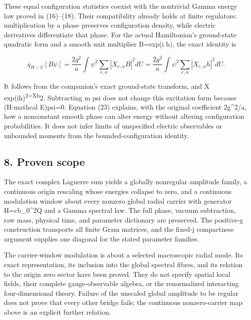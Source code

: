 \documentclass[
  11pt,
]{article}
\begin{document}
These equal configuration statistics coexist with the nontrivial Gamma
energy law proved in (16)--(18). Their compatibility already holds at
finite regulators: multiplication by a phase preserves configuration
density, while electric derivatives differentiate that phase. For the
actual Hamiltonian's ground-state quadratic form and a smooth unit
multiplier B=exp(i h), the exact identity is

\[
 q_{H-\mathcal E}[B\psi]
   =\frac{2g^2}{a}\int\psi^2
      \sum_{e,\alpha}|X_{e,\alpha}B|^2dU
   =\frac{2g^2}{a}\int\psi^2
      \sum_{e,\alpha}|X_{e,\alpha}h|^2dU.
 \tag{23}
\]

It follows from the companion's exact ground-state transform, and
\textbar X exp(ih)\textbar{}\textsuperscript{2=\textbar Xh\textbar{}}2.
Subtracting m psi does not change this excitation form because
(H-mathcal E)psi=0. Equation (23) explains, with the original
coefficient 2g\^{}2/a, how a nonconstant smooth phase can alter energy
without altering configuration probabilities. It does not infer limits
of unspecified electric observables or unbounded moments from the
bounded-configuration identity.

\subsection{8. Proven scope}\label{weak-coupling-part-5-proven-scope}

The exact complex Laguerre sum yields a globally nonregular amplitude
family, a continuous origin rescaling whose energies collapse to zero,
and a continuous modulation window about every nonzero global radial
carrier with generator H=cb\_0\^{}2Q and a Gamma spectral law. The full
phase, vacuum subtraction, raw mass, physical time, and parameter
dictionary are preserved. The positive-g construction transports all
finite Gram matrices, and the fixed-j compactness argument supplies one
diagonal for the stated parameter families.

The carrier-window modulation is about a selected macroscopic radial
mode. Its exact representation, its inclusion into the global spectral
fibres, and its relation to the origin zero sector have been proved.
They do not specify spatial local fields, their complete
gauge-observable algebra, or the renormalized interacting
four-dimensional theory. Failure of the unscaled global amplitude to be
regular does not prove that every other bridge fails; the continuous
nonzero-carrier map above is an explicit further relation.
\end{document}
